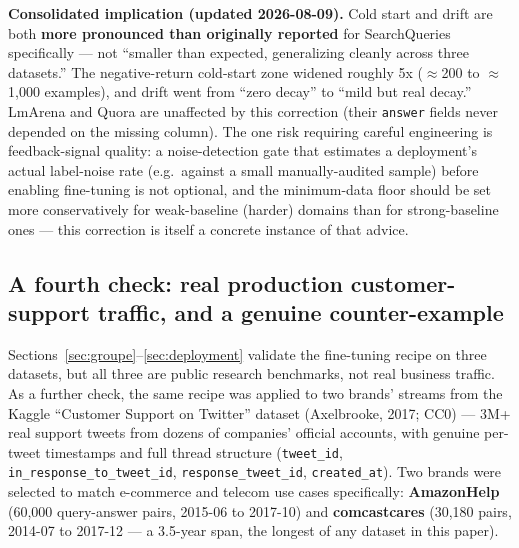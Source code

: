 \documentclass[11pt]{article}
\begin{document}
\textbf{Consolidated implication (updated 2026-08-09).} Cold start and drift are both \textbf{more pronounced than originally reported} for SearchQueries specifically --- not ``smaller than expected, generalizing cleanly across three datasets.'' The negative-return cold-start zone widened roughly 5x ($\approx$200 to $\approx$1{,}000 examples), and drift went from ``zero decay'' to ``mild but real decay.'' LmArena and Quora are unaffected by this correction (their \texttt{answer} fields never depended on the missing column). The one risk requiring careful engineering is feedback-signal quality: a noise-detection gate that estimates a deployment's actual label-noise rate (e.g.\ against a small manually-audited sample) before enabling fine-tuning is not optional, and the minimum-data floor should be set more conservatively for weak-baseline (harder) domains than for strong-baseline ones --- this correction is itself a concrete instance of that advice.

\subsection{A fourth check: real production customer-support traffic, and a genuine counter-example}
\label{sec:twitter}

Sections~\ref{sec:groupe}--\ref{sec:deployment} validate the fine-tuning recipe on three datasets, but all three are public research benchmarks, not real business traffic. As a further check, the same recipe was applied to two brands' streams from the Kaggle ``Customer Support on Twitter'' dataset (Axelbrooke, 2017; CC0) --- 3M+ real support tweets from dozens of companies' official accounts, with genuine per-tweet timestamps and full thread structure (\texttt{tweet\_\allowbreak{}id}, \texttt{in\_\allowbreak{}response\_\allowbreak{}to\_\allowbreak{}tweet\_\allowbreak{}id}, \texttt{response\_\allowbreak{}tweet\_\allowbreak{}id}, \texttt{created\_\allowbreak{}at}). Two brands were selected to match e-commerce and telecom use cases specifically: \textbf{AmazonHelp} (60,000 query-answer pairs, 2015-06 to 2017-10) and \textbf{comcastcares} (30,180 pairs, 2014-07 to 2017-12 --- a 3.5-year span, the longest of any dataset in this paper).
\end{document}
